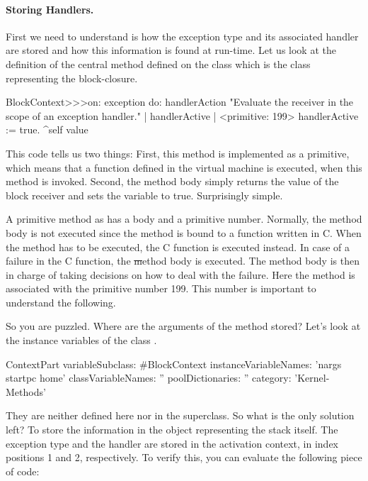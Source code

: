 \documentclass[a4paper,10pt,twoside]{book}
\begin{document}
\paragraph{Storing Handlers.}
First we need to understand is how the exception type and its associated handler  are stored and how this information is found at run-time. Let us look at the definition of the central method  defined on the class  which is the class representing the block-closure. 

\begin{code}{}
BlockContext>>>on: exception do: handlerAction 
	"Evaluate the receiver in the scope of an exception handler." 
	| handlerActive | 
	<primitive: 199> 
	handlerActive := true. 
	^self value 
\end{code}

This code tells us two things: First, this method is implemented as a primitive, which means that  a function defined in the virtual machine is executed, when this method is invoked. Second, the method body simply returns the value of the block receiver and sets the variable  to true. Surprisingly simple. 

A primitive method as  has a body and a primitive number. Normally, the method body is not executed since the method is bound to a function written in C. When the method has to be executed, the C function is executed instead. In case of a failure in the C function, the \st method body is executed. The method body is then in charge of taking decisions on how to deal with the failure.
Here the method  is associated with the primitive number 199. This number is important to understand the following. 

So you are puzzled. Where are the arguments of the  method stored? Let's look at the instance variables of the class . 

\begin{code}{}
ContextPart variableSubclass: #BlockContext
	instanceVariableNames: 'nargs startpc home'
	classVariableNames: ''
	poolDictionaries: ''
	category: 'Kernel-Methods'
\end{code}

They are neither defined here nor in the superclass. So what is the only solution left? To store the information in the object representing the stack itself. The exception type and the handler are stored in the activation context, in index positions 1 and 2, respectively. To verify this, you can evaluate the following piece of code:
\end{document}
